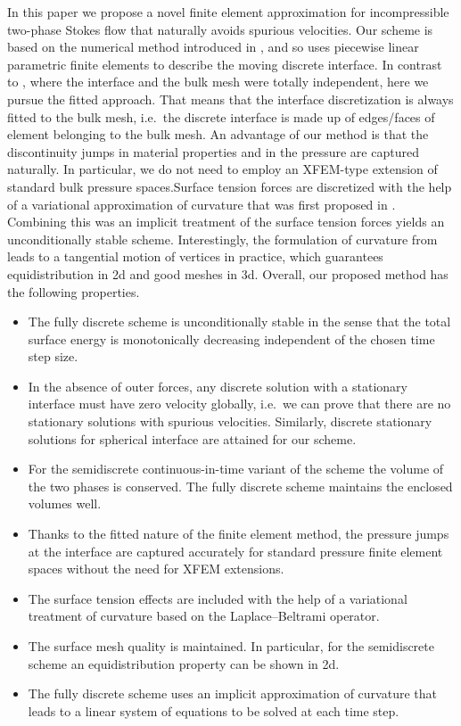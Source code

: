 \documentclass[a4paper,12pt,onecolumn]{article}
\begin{document}
In this paper we propose a novel finite element approximation for
incompressible two-phase Stokes flow that naturally avoids spurious
velocities. Our scheme is based on the numerical method introduced in
\cite{spurious}, and so uses piecewise linear parametric finite elements to
describe the moving discrete interface. In contrast to \cite{spurious}, where
the interface and the bulk mesh were totally independent, here we pursue the
fitted approach. That means that the interface discretization is always fitted
to the bulk mesh, i.e.\ the discrete interface is made up of edges/faces of
element belonging to the bulk mesh. An advantage of our method is that the
discontinuity jumps in material properties and in the pressure are captured
naturally. In particular, we do not need to employ an XFEM-type extension of
standard bulk pressure spaces.Surface tension forces are discretized with the 
help of a variational approximation of curvature that was first proposed in 
\cite{triplej,gflows3d}. Combining this was an implicit treatment of the 
surface tension forces yields an unconditionally stable scheme. Interestingly, 
the formulation of curvature from \cite{triplej} leads to a tangential motion 
of vertices in practice, which guarantees equidistribution in 2d and good 
meshes in 3d. Overall, our proposed method has the following properties.
\begin{itemize}
\item The fully discrete scheme is unconditionally stable in the sense that the
total surface energy is monotonically decreasing independent of the chosen time
step size.
\item In the absence of outer forces, any discrete solution with a stationary 
interface must have zero velocity globally, i.e.\ we can prove that there are 
no stationary solutions with spurious velocities. Similarly, discrete 
stationary solutions for spherical interface are attained for our scheme.
\item For the semidiscrete continuous-in-time variant of the scheme the volume 
of the two phases is conserved. The fully discrete scheme maintains the
enclosed volumes well.
\item Thanks to the fitted nature of the finite element method, the pressure
jumps at the interface are captured accurately for standard pressure finite
element spaces without the need for XFEM extensions.
\item The surface tension effects are included with the help of a variational
treatment of curvature based on the Laplace--Beltrami operator.
\item The surface mesh quality is maintained. In particular, for the
semidiscrete scheme an equidistribution property can be shown in 2d.
\item The fully discrete scheme uses an implicit approximation of curvature
that leads to a linear system of equations to be solved at each time step.
\end{itemize}
\end{document}
